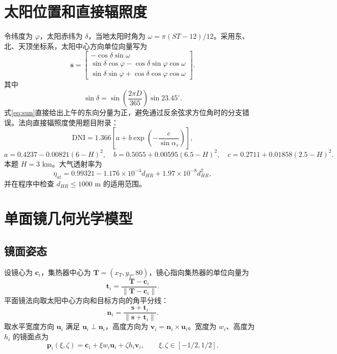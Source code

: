 \documentclass[UTF8,a4paper,11pt]{ctexart}
\newcommand{\vect}[1]{\bm{#1}}
\begin{document}
\section{太阳位置和直接辐照度}
令纬度为 $\varphi$，太阳赤纬为 $\delta$，当地太阳时角为 $\omega=\pi(ST-12)/12$。采用东、北、天顶坐标系，太阳中心方向单位向量写为
\begin{equation}
 \vect s=\begin{bmatrix}
 -\cos\delta\sin\omega\\
 \sin\delta\cos\varphi-\cos\delta\sin\varphi\cos\omega\\
 \sin\delta\sin\varphi+\cos\delta\cos\varphi\cos\omega
 \end{bmatrix}.
 \label{eq:sun}
\end{equation}
其中
\begin{equation}
 \sin\delta=\sin\left(\frac{2\pi D}{365}\right)\sin 23.45^\circ.
\end{equation}
式\eqref{eq:sun}直接给出上午的东向分量为正，避免通过反余弦求方位角时的分支错误。法向直接辐照度使用题目附录：
\begin{equation}
 \mathrm{DNI}=1.366\left[a+b\exp\left(-\frac{c}{\sin\alpha_s}\right)\right],
\end{equation}
\begin{equation}
 a=0.4237-0.00821(6-H)^2,\quad b=0.5055+0.00595(6.5-H)^2,\quad c=0.2711+0.01858(2.5-H)^2.
\end{equation}
本题 $H=3$ km。大气透射率为
\begin{equation}
 \eta_{at}=0.99321-1.176\times10^{-4}d_{HR}+1.97\times10^{-8}d_{HR}^2,
 \label{eq:atmosphere}
\end{equation}
并在程序中检查 $d_{HR}\le1000$ m 的适用范围。

\section{单面镜几何光学模型}
\subsection{镜面姿态}
设镜心为 $\vect c_i$，集热器中心为 $\vect T=(x_T,y_T,80)$，镜心指向集热器的单位向量为
\begin{equation}
 \vect t_i=\frac{\vect T-\vect c_i}{\|\vect T-\vect c_i\|}.
\end{equation}
平面镜法向取太阳中心方向和目标方向的角平分线：
\begin{equation}
 \vect n_i=\frac{\vect s+\vect t_i}{\|\vect s+\vect t_i\|}.
 \label{eq:normal}
\end{equation}
取水平宽度方向 $\vect u_i$ 满足 $\vect u_i\perp\vect n_i$，高度方向为 $\vect v_i=\vect n_i\times\vect u_i$。宽度为 $w_i$、高度为 $h_i$ 的镜面点为
\begin{equation}
 \vect p_i(\xi,\zeta)=\vect c_i+\xi w_i\vect u_i+\zeta h_i\vect v_i,\qquad \xi,\zeta\in[-1/2,1/2].
 \label{eq:mirrorpoint}
\end{equation}
\end{document}
